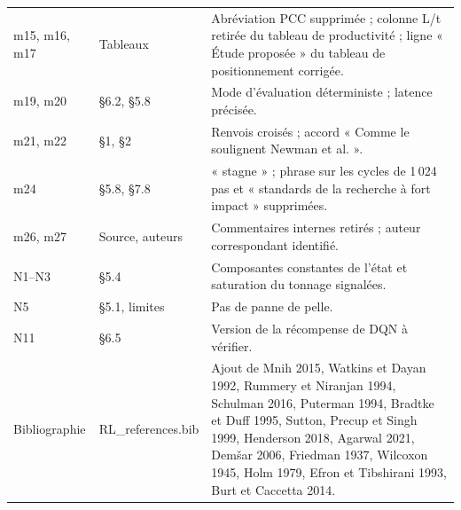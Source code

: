 \documentclass[11pt,a4paper]{article}
\begin{document}
\begin{longtable}{p{2.2cm}p{4.3cm}p{8.6cm}}
m15, m16, m17 & Tableaux & Abréviation PCC supprimée ; colonne L/t retirée du tableau de productivité ; ligne « Étude proposée » du tableau de positionnement corrigée. \\
m19, m20 & §6.2, §5.8 & Mode d'évaluation déterministe ; latence précisée. \\
m21, m22 & §1, §2 & Renvois croisés ; accord « Comme le soulignent Newman et al. ». \\
m24 & §5.8, §7.8 & « stagne » ; phrase sur les cycles de 1\,024 pas et « standards de la recherche à fort impact » supprimées. \\
m26, m27 & Source, auteurs & Commentaires internes retirés ; auteur correspondant identifié. \\
N1--N3 & §5.4 & Composantes constantes de l'état et saturation du tonnage signalées. \\
N5 & §5.1, limites & Pas de panne de pelle. \\
N11 & §6.5 & Version de la récompense de DQN à vérifier. \\
Bibliographie & RL\_references.bib & Ajout de Mnih 2015, Watkins et Dayan 1992, Rummery et Niranjan 1994, Schulman 2016, Puterman 1994, Bradtke et Duff 1995, Sutton, Precup et Singh 1999, Henderson 2018, Agarwal 2021, Demšar 2006, Friedman 1937, Wilcoxon 1945, Holm 1979, Efron et Tibshirani 1993, Burt et Caccetta 2014. \\
\bottomrule
\end{longtable}
\normalsize
\fi
\end{document}

